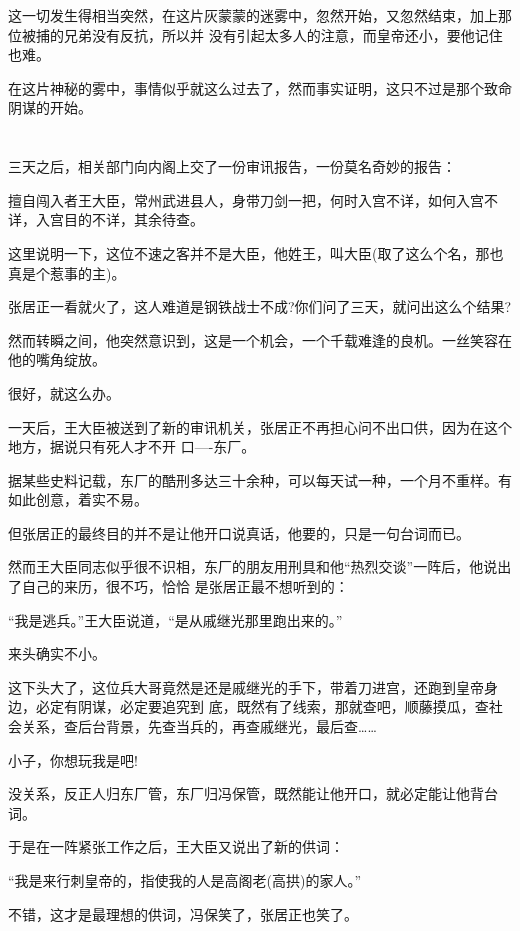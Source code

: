 \documentclass[11pt,a4paper,onecolumn]{article}
\begin{document}
这一切发生得相当突然，在这片灰蒙蒙的迷雾中，忽然开始，又忽然结束，加上那位被捕的兄弟没有反抗，所以并
没有引起太多人的注意，而皇帝还小，要他记住也难。

在这片神秘的雾中，事情似乎就这么过去了，然而事实证明，这只不过是那个致命阴谋的开始。

\section[\thesection]{}

三天之后，相关部门向内阁上交了一份审讯报告，一份莫名奇妙的报告：

擅自闯入者王大臣，常州武进县人，身带刀剑一把，何时入宫不详，如何入宫不详，入宫目的不详，其余待查。

这里说明一下，这位不速之客并不是大臣，他姓王，叫大臣(取了这么个名，那也真是个惹事的主)。

张居正一看就火了，这人难道是钢铁战士不成?你们问了三天，就问出这么个结果?

然而转瞬之间，他突然意识到，这是一个机会，一个千载难逢的良机。一丝笑容在他的嘴角绽放。

很好，就这么办。

一天后，王大臣被送到了新的审讯机关，张居正不再担心问不出口供，因为在这个地方，据说只有死人才不开
口----东厂。

据某些史料记载，东厂的酷刑多达三十余种，可以每天试一种，一个月不重样。有如此创意，着实不易。

但张居正的最终目的并不是让他开口说真话，他要的，只是一句台词而已。

然而王大臣同志似乎很不识相，东厂的朋友用刑具和他``热烈交谈''一阵后，他说出了自己的来历，很不巧，恰恰
是张居正最不想听到的：

``我是逃兵。''王大臣说道，``是从戚继光那里跑出来的。''

来头确实不小。

这下头大了，这位兵大哥竟然是还是戚继光的手下，带着刀进宫，还跑到皇帝身边，必定有阴谋，必定要追究到
底，既然有了线索，那就查吧，顺藤摸瓜，查社会关系，查后台背景，先查当兵的，再查戚继光，最后查……

小子，你想玩我是吧!

没关系，反正人归东厂管，东厂归冯保管，既然能让他开口，就必定能让他背台词。

于是在一阵紧张工作之后，王大臣又说出了新的供词：

``我是来行刺皇帝的，指使我的人是高阁老(高拱)的家人。''

不错，这才是最理想的供词，冯保笑了，张居正也笑了。
\end{document}
